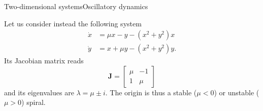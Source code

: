 \documentclass[usenames,dvipsnames,svgnames,10pt,aspectratio=169]{beamer}
\begin{document}
\begin{frame}[t, c]{Two-dimensional systems}{Oscillatory dynamics}
  \begin{minipage}{.58\textwidth}
    Let us consider instead the following system
    \[
    \begin{aligned}
      \dot{x} & = \mu x - y - (x^2 + y^2) x \\
      \dot{y} & = x + \mu y - (x^2 + y^2) y.
    \end{aligned}
    \]
    Its Jacobian matrix reads
    \[
    \bm{J} = \begin{bmatrix} \mu & -1 \\ 1 & \mu \end{bmatrix}
    \]
    and its eigenvalues are $\lambda = \mu \pm i $.
    The origin is thus a stable ($\mu < 0$) or unstable ($\mu > 0$) spiral.
  \end{minipage}%
  \hfill
  \begin{minipage}{.38\textwidth}
    \centering
  \end{minipage}

  \vspace{1cm}
\end{frame}
\end{document}

